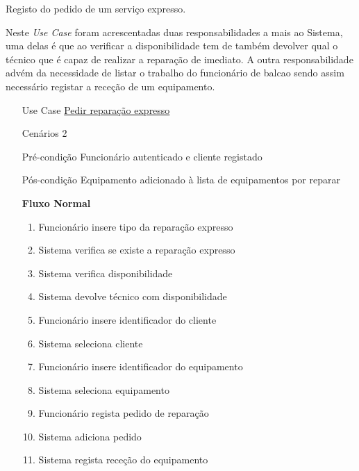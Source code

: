 \documentclass[../relatorio.tex]{subfiles}
\begin{document}
Registo do pedido de um serviço expresso.

Neste \textit{Use Case} foram acrescentadas duas responsabilidades a mais ao Sistema, uma delas é que ao verificar a disponibilidade
tem de também devolver qual o técnico que é capaz de realizar a reparação de imediato. A outra responsabilidade advém da necessidade de listar
o trabalho do funcionário de balcao sendo assim necessário registar a receção de um equipamento.
\begin{itemize}
    \item[Use Case] {\underline{Pedir reparação expresso}}
    \item[Cenários] {2}
    \item[Pré-condição] {Funcionário autenticado e cliente registado}
    \item[Pós-condição] {Equipamento adicionado à lista de equipamentos por reparar}
          \begin{flushleft}
              \textbf{Fluxo Normal}
          \end{flushleft}
          \begin{enumerate}
              \item Funcionário insere tipo da reparação expresso 
              \item Sistema verifica se existe a reparação expresso
              \item Sistema verifica disponibilidade
              \item Sistema devolve técnico com disponibilidade
              \item Funcionário insere identificador do cliente
              \item Sistema seleciona cliente
              \item Funcionário insere identificador do equipamento
              \item Sistema seleciona equipamento
              \item Funcionário regista pedido de reparação
              \item Sistema adiciona pedido
              \item Sistema regista receção do equipamento
          \end{enumerate}


\end{itemize}
\end{document}

